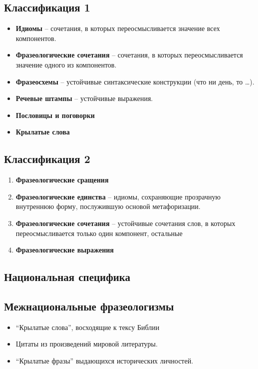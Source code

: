 \documentclass{article}
\begin{document}
\subsection{Классификация 1}

\begin{itemize}
    \item \textbf{Идиомы} -- сочетания, в которых переосмысливается значение всех компонентов.
    \item \textbf{Фразеологические сочетания} -- сочетания, в которых переосмысливается значение
    одного из компонентов.
    \item \textbf{Фразеосхемы} -- устойчивые синтаксические конструкции (что ни день, то \dots).
    \item \textbf{Речевые штампы} -- устойчивые выражения.
    \item \textbf{Пословицы и поговорки}
    \item \textbf{Крылатые слова}
\end{itemize}

\subsection{Классификация 2}

\begin{enumerate}
    \item \textbf{Фразеологические сращения}
    \item \textbf{Фразеологические единства} -- идиомы, сохраняющие прозрачную внутреннюю форму,
    послужившую основой метафоризации.
    \item \textbf{Фразеологические сочетания} -- устойчивые сочетания слов, в которых переосмысливается
    только один компонент, остальные 
    \item \textbf{Фразеологические выражения}
\end{enumerate}

\subsection{Национальная специфика}

\subsection{Межнациональные фразеологизмы}

\begin{itemize}
    \item ``Крылатые слова'', восходящие к тексу Библии
    \item Цитаты из произведений мировой литературы.
    \item ``Крылатые фразы'' выдающихся исторических личностей.
\end{itemize}
\end{document}
